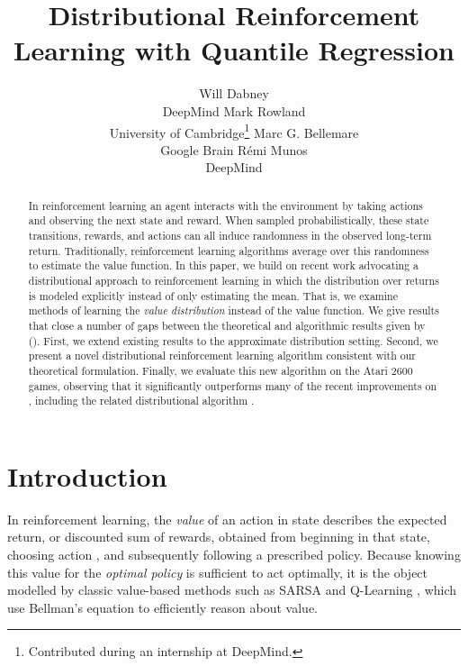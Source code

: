 \documentclass[letterpaper]{article}
\newcommand{\citet}[1]{\citeauthor{#1} (\citeyear{#1})}
\begin{document}
\title{Distributional Reinforcement Learning with Quantile Regression}
\author{Will Dabney\\ DeepMind \And Mark Rowland\\ University of Cambridge\thanks{Contributed during an internship at DeepMind.} \And Marc G. Bellemare\\ Google Brain \And R\'emi Munos\\ DeepMind}

\nocopyright

\maketitle
\begin{abstract}
In reinforcement learning an agent interacts with the environment by taking actions and observing the next state and reward. When sampled probabilistically, these state transitions, rewards, and actions can all induce randomness in the observed long-term return. Traditionally, reinforcement learning algorithms average over this randomness to estimate the value function. In this paper, we build on recent work advocating a distributional approach to reinforcement learning in which the distribution over returns is modeled explicitly instead of only estimating the mean. That is, we examine methods of learning the \textit{value distribution} instead of the value function. We give results that close a number of gaps between the theoretical and algorithmic results given by \citet{c51}. First, we extend existing results to the approximate distribution setting. Second, we present a novel distributional reinforcement learning algorithm consistent with our theoretical formulation. Finally, we evaluate this new algorithm on the Atari 2600 games, observing that it significantly outperforms many of the recent improvements on , including the related distributional algorithm .
\end{abstract}

\section{Introduction}

In reinforcement learning, the \emph{value} of an action  in state  describes the expected return, or discounted sum of rewards, obtained from beginning in that state, choosing action , and subsequently following a prescribed policy. Because knowing this value for the \emph{optimal policy} is sufficient to act optimally, it is the object modelled by classic value-based methods such as SARSA \cite{rummery94online} and Q-Learning \cite{watkins1992q}, which use Bellman's equation \cite{bellman57dynamic} to efficiently reason about value.
\end{document}

